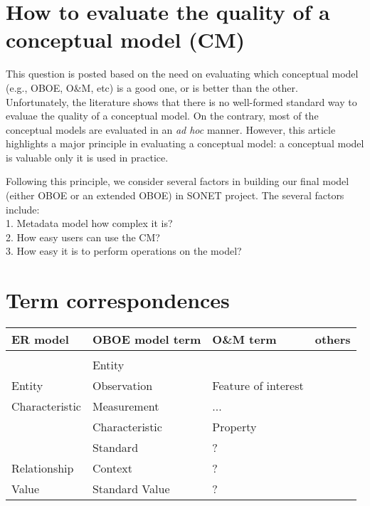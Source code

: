 \documentclass{article}
\begin{document}
\section{How to evaluate the quality of a conceptual model (CM)}

This question is posted based on the need on evaluating which conceptual model 
(e.g., OBOE, O\&M, etc) is a good one, or is better than the other. 
Unfortunately, the literature \cite{DBLP:journals/dke/Moody05} shows that
there is no well-formed standard way to evaluae the quality of a conceptual model. 
On the contrary, most of the conceptual models are evaluated in an {\em ad hoc} manner. 
However, this article highlights a major principle in evaluating a conceptual model: 
a conceptual model is valuable only it is used in practice. 

Following this principle, we consider several factors in building our final model 
(either OBOE or an extended OBOE) in SONET project. The several factors include:\\  
1. Metadata model how complex it is?\\
2. How easy users can use the CM?\\
3. How easy it is to perform operations on the model? \\

\section{Term correspondences}
\begin{table}[htb]
\begin{tabular}{|l|l|l|l|}
\hline ER model & OBOE model term & O\&M term &others\\\hline
\\\hline
                      & Entity & &\\\hline
Entity             & Observation & Feature of interest & \\\hline
Characteristic & Measurement & ... & \\\hline
                       & Characteristic & Property&\\\hline
                       & Standard & ? & \\\hline
Relationship   & Context & ? & \\\hline
Value              & Standard Value & ? & \\\hline
\end{tabular}
\end{table}
\end{document}
